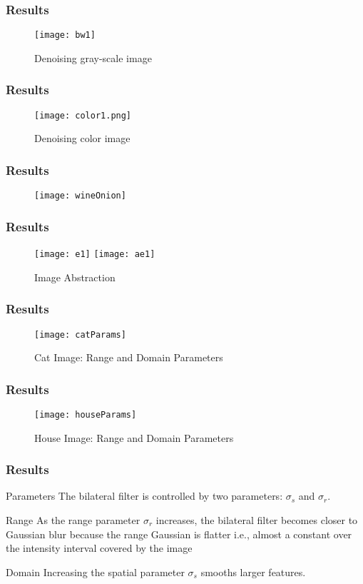 \documentclass{beamer}
\begin{document}
\begin{frame}
\frametitle{Results}
\begin{figure}
\texttt{[image: bw1]}
\caption{Denoising gray-scale image}
\end{figure}
\end{frame}

\begin{frame}
\frametitle{Results}
\begin{figure}
\texttt{[image: color1.png]}
\caption{Denoising color image}
\end{figure}
\end{frame}

\begin{frame}
\frametitle{Results}
\begin{figure}
\texttt{[image: wineOnion]}
\end{figure}
\end{frame}

\begin{frame}
\frametitle{Results}
\begin{figure}
   \texttt{[image: e1]}
   \texttt{[image: ae1]}
   \caption{Image Abstraction}
\end{figure}
\end{frame}

\begin{frame}
\frametitle{Results}
\begin{figure}
\texttt{[image: catParams]}
\caption{Cat Image: Range and Domain Parameters}
\end{figure}
\end{frame}

\begin{frame}
\frametitle{Results}
\begin{figure}
\texttt{[image: houseParams]}
\caption{House Image: Range and Domain Parameters}
\end{figure}
\end{frame}

\begin{frame}
\frametitle{Results}
\begin{block}{Parameters}
The bilateral filter is controlled by two parameters: $ \sigma_{s} $ and $ \sigma_{r} $.
\end{block}

\begin{block}{Range}
As the range parameter $ \sigma_{r} $ increases, the bilateral filter becomes closer to Gaussian blur
because the range Gaussian is flatter i.e., almost a constant over the intensity interval
covered by the image
\end{block}

\begin{block}{Domain}
Increasing the spatial parameter $ \sigma_{s} $ smooths larger features.
\end{block}
\end{frame}
\end{document}
